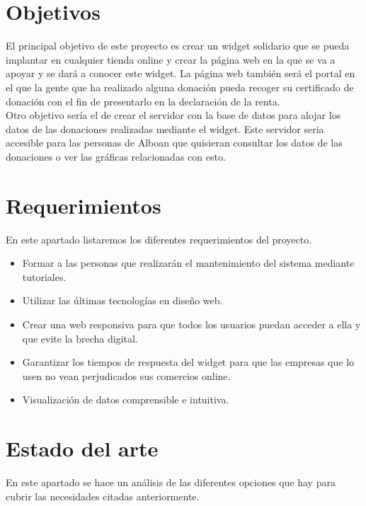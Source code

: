 
\newpage

\section{Objetivos}

El principal objetivo de este proyecto es crear un widget solidario que se pueda implantar en cualquier tienda online y crear la página web en la que se va a apoyar y se dará a conocer este widget. La página web también será el portal en el que la gente que ha realizado alguna donación pueda recoger su certificado de donación con el fin de presentarlo en la declaración de la renta.\\
Otro objetivo sería el de crear el servidor con la base de datos para alojar los datos de las donaciones realizadas mediante el widget. Este servidor seria accesible para las personas de Alboan que quisieran consultar los datos de las donaciones o ver las gráficas relacionadas con esto.  \\

\section{Requerimientos}

En este apartado listaremos los diferentes requerimientos del proyecto.

\begin{itemize}
	\item Formar a las personas que realizarán el mantenimiento del sistema mediante tutoriales.
	\item Utilizar las últimas tecnologías en diseño web.
	\item Crear una web responsiva para que todos los usuarios puedan acceder a ella y que evite la brecha digital.
	\item Garantizar los tiempos de respuesta del widget para que las empresas que lo usen no vean perjudicados sus comercios online.
	\item Visualización de datos comprensible e intuitiva.
\end{itemize}

\section{Estado del arte}
En este apartado se hace un análisis de las diferentes opciones que hay para cubrir las necesidades citadas anteriormente.
